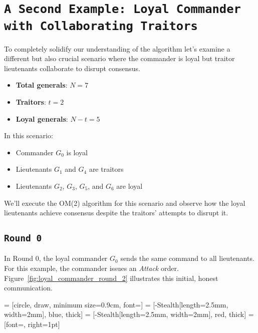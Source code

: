 \documentclass[11pt]{article}
\newcommand{\gen}[1]{\ensuremath{G_{#1}}}
\begin{document}
\section*{\texttt{\Large A Second Example: Loyal Commander with Collaborating Traitors}}

\justifying
To completely solidify our understanding of the algorithm let's examine a different but also  crucial scenario where the commander is loyal but traitor lieutenants collaborate to disrupt consensus.

\begin{itemize}
    \item \textbf{Total generals}: $N = 7$
    \item \textbf{Traitors}: $t = 2$
    \item \textbf{Loyal generals}: $N - t = 5$
\end{itemize}

In this scenario:
\begin{itemize}
    \item Commander $\gen{0}$ is loyal
    \item Lieutenants $\gen{1}$ and $\gen{4}$ are traitors
    \item Lieutenants $\gen{2}$, $\gen{3}$, $\gen{5}$, and $\gen{6}$ are loyal
\end{itemize}

We'll execute the OM(2) algorithm for this scenario and observe how the loyal lieutenants achieve consensus despite the traitors' attempts to disrupt it.

\subsection*{\texttt{\large Round 0}}
\justifying
In Round 0, the loyal commander $\gen{0}$ sends the same command to all lieutenants. For this example, the commander issues an \textit{Attack} order. Figure~\ref{fig:loyal_commander_round_2} illustrates this initial, honest communication.

 = [circle, draw, minimum size=0.9cm, font=\small]
 = [-{Stealth[length=2.5mm, width=2mm]}, blue, thick] %
 = [-{Stealth[length=2.5mm, width=2mm]}, red, thick]  %
 = [font=\scriptsize, right=1pt]
\end{document}
